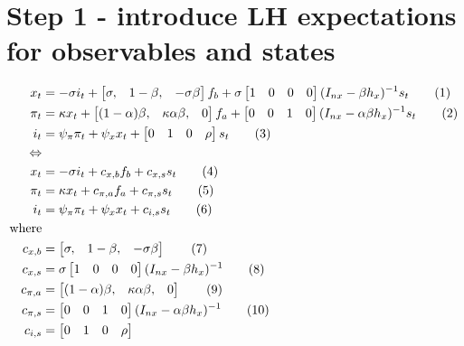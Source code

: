 \documentclass[11pt]{article}
\renewcommand{\[}{\begin{equation}}
\renewcommand{\]}{\end{equation}}
\newcommand\numberthis{\addtocounter{equation}{1}\tag{\theequation}} %
\begin{document}
\section{Step 1 - introduce LH expectations for observables and states}
\begin{align*}
x_t &=  -\sigma i_t + \begin{bmatrix} \sigma, &1-\beta ,& -\sigma\beta \end{bmatrix}f_b + \sigma\begin{bmatrix} 1 &0 & 0 & 0 \end{bmatrix}(I_{nx}-\beta h_x)^{-1} s_t \numberthis \\
\pi_t &= \kappa x_t +  \begin{bmatrix} (1-\alpha)\beta, &\kappa\alpha\beta ,& 0 \end{bmatrix}f_a  + \begin{bmatrix} 0&0 & 1 & 0 \end{bmatrix}(I_{nx}-\alpha\beta h_x)^{-1} s_t \numberthis \\
i_t &= \psi_{\pi}\pi_t + \psi_{x} x_t  + \begin{bmatrix} 0 &1 & 0 & \rho \end{bmatrix}s_t  \numberthis \\
\Leftrightarrow & \\
x_t &=  -\sigma i_t + c_{x,b}f_b +c_{x,s} s_t \numberthis  \label{rf1}\\
\pi_t &= \kappa x_t + c_{\pi,a}f_a +c_{\pi,s} s_t \numberthis \label{rf2} \\
i_t &= \psi_{\pi}\pi_t + \psi_{x} x_t  + c_{i,s} s_t \numberthis \label{rf3} \\
\text{where} & \\
 c_{x,b} & =  \begin{bmatrix} \sigma, &1-\beta ,& -\sigma\beta \end{bmatrix} \numberthis\\
 c_{x,s} & =  \sigma\begin{bmatrix} 1 &0 & 0 & 0 \end{bmatrix}(I_{nx}-\beta h_x)^{-1} \numberthis \\
 c_{\pi,a} & =  \begin{bmatrix} (1-\alpha)\beta, &\kappa\alpha\beta ,& 0 \end{bmatrix} \numberthis \\
 c_{\pi,s} & =  \begin{bmatrix} 0&0 & 1 & 0 \end{bmatrix}(I_{nx}-\alpha\beta h_x)^{-1} \numberthis \\
  c_{i,s} & =  \begin{bmatrix} 0 &1 & 0 & \rho \end{bmatrix}
\end{align*}
\end{document}
